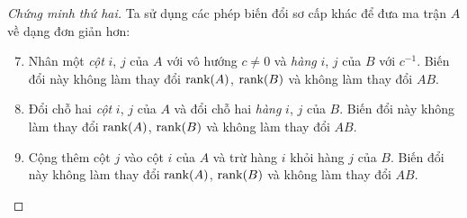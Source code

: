 \begin{proof}[Chứng minh thứ hai]
    Ta sử dụng các phép biến đổi sơ cấp khác để đưa ma trận $A$ về dạng đơn giản hơn:
    \begin{enumerate}[label = (\roman*)]
        \setcounter{enumi}{6}
        \item Nhân một \textit{cột} $i$, $j$ của $A$ với vô hướng $c\ne 0$ và \textit{hàng} $i$, $j$ của $B$ với $c^{-1}$. Biến đổi này không làm thay đổi $\text{rank}(A)$, $\text{rank}(B)$ và không làm thay đổi $AB$.
        \item Đổi chỗ hai \textit{cột} $i$, $j$ của $A$ và đổi chỗ hai \textit{hàng} $i$, $j$ của $B$. Biến đổi này không làm thay đổi $\text{rank}(A)$, $\text{rank}(B)$ và không làm thay đổi $AB$.
        \item Cộng thêm cột $j$ vào cột $i$ của $A$ và trừ hàng $i$ khỏi hàng $j$ của $B$. Biến đổi này không làm thay đổi $\text{rank}(A)$, $\text{rank}(B)$ và không làm thay đổi $AB$.
    \end{enumerate}
    

\end{proof}
